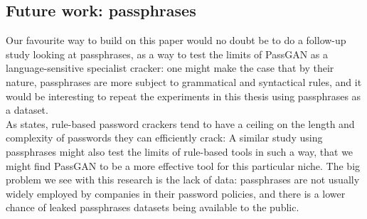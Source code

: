 \subsection{Future work: passphrases} 
Our favourite way to build on this paper would no doubt be to do a follow-up study looking at passphrases, as a way to test the limits of PassGAN as a language-sensitive specialist cracker: one might make the case that by their nature, passphrases are more subject to grammatical and syntactical rules, and it would be interesting to repeat the experiments in this thesis using passphrases as a dataset. \\
As \cite{Melicher2016} states, rule-based password crackers tend to have a ceiling on the length and complexity of passwords they can efficiently crack: A similar study using passphrases might also test the limits of rule-based tools in such a way, that we might find PassGAN to be a more effective tool for this particular niche. The big problem we see with this research is the lack of data: passphrases are not usually widely employed by companies in their password policies, and there is a lower chance of leaked passphrases datasets being available to the public.  
